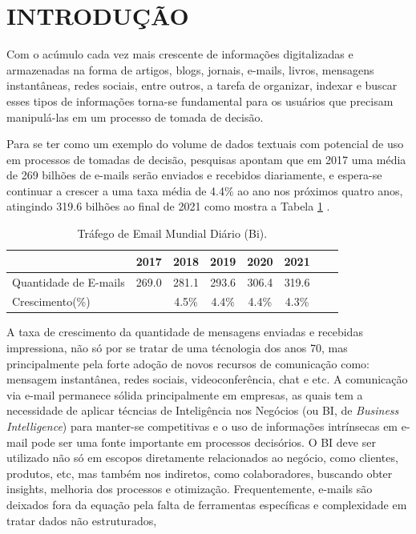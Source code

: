 \documentclass[12pt,a4paper]{article}
\begin{document}

\newpage
\thispagestyle{empty}
\tableofcontents

\newpage
\pagestyle{plain}
\renewcommand{\baselinestretch}{1.5}
\normalsize
\section{INTRODUÇÃO} \label{sec:introducao}
 
 Com o acúmulo cada vez mais crescente de informações digitalizadas e armazenadas na forma de artigos, blogs, jornais, e-mails, livros, mensagens instantâneas, redes sociais, entre outros, 
 a tarefa de organizar, indexar e buscar esses tipos de informações torna-se fundamental para os usuários que precisam manipulá-las em um processo de tomada de decisão. 
 
 Para se ter como um exemplo do volume de dados textuais com potencial de uso em processos de tomadas de decisão, pesquisas apontam que em 2017 uma média de 269 bilhões de e-mails serão enviados e recebidos diariamente, e espera-se continuar a crescer a uma taxa média de 4.4\% ao ano nos próximos quatro anos, atingindo 319.6 bilhões ao final de 2021 como mostra a Tabela \ref{tb_email} \cite{radicati2017}.

\begin{table}[H]
  \centering
  \begin{tabular}{l*{6}{c}r}
  &					2017 &	2018 &	2019 &	2020 &	2021 & \\
  \hline
  Quantidade de E-mails &			269.0 &	281.1 &	293.6 &	306.4 &	319.6 & \\
  Crescimento(\%) &  	&		4.5\% &	4.4\% &	4.4\% &	4.3\% & \\
  \hline
  \end{tabular}
  \caption{Tráfego de Email Mundial Diário  (Bi). \cite{radicati2017}}
  \label{tb_email}
\end{table}

A taxa de crescimento da quantidade de mensagens enviadas e recebidas impressiona, não só por se tratar de uma técnologia dos anos 70,
mas principalmente pela forte adoção de novos recursos de comunicação como: mensagem instantânea, redes sociais, videoconferência, chat e etc. A comunicação via e-mail permanece sólida principalmente em empresas, as quais tem a necessidade de aplicar técncias de Inteligência nos Negócios (ou BI, de \textit{Business Intelligence}) para manter-se competitivas e o uso de informações intrínsecas em e-mail pode ser uma fonte importante em processos decisórios. O BI deve ser utilizado não só em escopos diretamente relacionados ao negócio,
como clientes, produtos, etc, mas também nos indiretos, como colaboradores, buscando obter insights, melhoria dos processos e otimização.
Frequentemente, e-mails são deixados fora da equação pela falta de ferramentas específicas e complexidade em tratar dados não estruturados,
 
\end{document}
